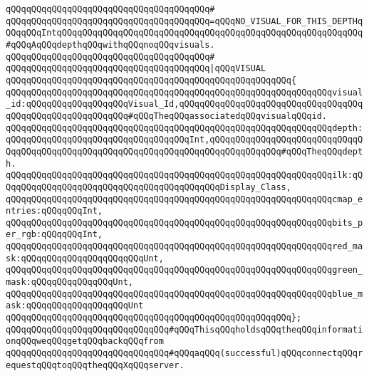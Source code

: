 \verb|qQQqqQQqqQQqqQQqqQQqqQQqqQQqqQQqqQQqqQQq#|\newline
\verb|qQQqqQQqqQQqqQQqqQQqqQQqqQQqqQQqqQQqqQQq=qQQqNO_VISUAL_FOR_THIS_DEPTHqQQqqQQqIntqQQqqQQqqQQqqQQqqQQqqQQqqQQqqQQqqQQqqQQqqQQqqQQqqQQqqQQqqQQq#qQQqAqQQqdepthqQQqwithqQQqnoqQQqvisuals.|\newline
\verb|qQQqqQQqqQQqqQQqqQQqqQQqqQQqqQQqqQQqqQQq#|\newline
\verb|qQQqqQQqqQQqqQQqqQQqqQQqqQQqqQQqqQQqqQQq|\verb#|qQQqVISUAL#\newline
\verb|qQQqqQQqqQQqqQQqqQQqqQQqqQQqqQQqqQQqqQQqqQQqqQQqqQQqqQQq{|\newline
\verb|qQQqqQQqqQQqqQQqqQQqqQQqqQQqqQQqqQQqqQQqqQQqqQQqqQQqqQQqqQQqqQQqvisual_id:qQQqqQQqqQQqqQQqqQQqVisual_Id,qQQqqQQqqQQqqQQqqQQqqQQqqQQqqQQqqQQqqQQqqQQqqQQqqQQqqQQqqQQq#qQQqTheqQQqassociatedqQQqvisualqQQqid.|\newline
\verb|qQQqqQQqqQQqqQQqqQQqqQQqqQQqqQQqqQQqqQQqqQQqqQQqqQQqqQQqqQQqqQQqdepth:qQQqqQQqqQQqqQQqqQQqqQQqqQQqqQQqqQQqInt,qQQqqQQqqQQqqQQqqQQqqQQqqQQqqQQqqQQqqQQqqQQqqQQqqQQqqQQqqQQqqQQqqQQqqQQqqQQqqQQqqQQq#qQQqTheqQQqdepth.|\newline
\verb|qQQqqQQqqQQqqQQqqQQqqQQqqQQqqQQqqQQqqQQqqQQqqQQqqQQqqQQqqQQqqQQqilk:qQQqqQQqqQQqqQQqqQQqqQQqqQQqqQQqqQQqqQQqqQQqDisplay_Class,|\newline
\verb|qQQqqQQqqQQqqQQqqQQqqQQqqQQqqQQqqQQqqQQqqQQqqQQqqQQqqQQqqQQqqQQqcmap_entries:qQQqqQQqInt,|\newline
\verb|qQQqqQQqqQQqqQQqqQQqqQQqqQQqqQQqqQQqqQQqqQQqqQQqqQQqqQQqqQQqqQQqbits_per_rgb:qQQqqQQqInt,|\newline
\verb|qQQqqQQqqQQqqQQqqQQqqQQqqQQqqQQqqQQqqQQqqQQqqQQqqQQqqQQqqQQqqQQqred_mask:qQQqqQQqqQQqqQQqqQQqqQQqUnt,|\newline
\verb|qQQqqQQqqQQqqQQqqQQqqQQqqQQqqQQqqQQqqQQqqQQqqQQqqQQqqQQqqQQqqQQqgreen_mask:qQQqqQQqqQQqqQQqUnt,|\newline
\verb|qQQqqQQqqQQqqQQqqQQqqQQqqQQqqQQqqQQqqQQqqQQqqQQqqQQqqQQqqQQqqQQqblue_mask:qQQqqQQqqQQqqQQqqQQqUnt|\newline
\verb|qQQqqQQqqQQqqQQqqQQqqQQqqQQqqQQqqQQqqQQqqQQqqQQqqQQqqQQq};|\newline
\newline
\newline
\verb|qQQqqQQqqQQqqQQqqQQqqQQqqQQqqQQq#qQQqThisqQQqholdsqQQqtheqQQqinformationqQQqweqQQqgetqQQqbackqQQqfrom|\newline
\verb|qQQqqQQqqQQqqQQqqQQqqQQqqQQqqQQq#qQQqaqQQq(successful)qQQqconnectqQQqrequestqQQqtoqQQqtheqQQqXqQQqserver.|\newline
